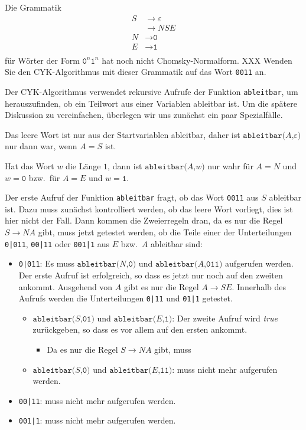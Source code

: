 Die Grammatik
\begin{align*}
S&\to \varepsilon \\
 &\to NSE \\
N&\to \texttt{0} \\
E&\to \texttt{1} \\
\end{align*}
für Wörter der Form
$\texttt{0}^n\texttt{1}^n$
hat noch nicht Chomsky-Normalform.
XXX
Wenden Sie den CYK-Algorithmus mit dieser Grammatik auf das Wort
\texttt{0011} an.

\def\ableitbar#1#2{
	\texttt{ableitbar(}#1\texttt{,}#2\texttt{)}
}

\begin{loesung}
Der CYK-Algorithmus verwendet rekursive Aufrufe der Funktion
\texttt{ableitbar}, um herauszufinden, ob ein Teilwort aus einer 
Variablen ableitbar ist.
Um die spätere Diskussion zu vereinfachen, überlegen wir uns zunächst
ein paar Spezialfälle.

Das leere Wort ist nur aus der Startvariablen ableitbar, daher ist
$\ableitbar{A}{\varepsilon}$ nur dann war, wenn $A=S$ ist.

Hat das Wort $w$ die Länge $1$, dann ist 
$\ableitbar{A}{w}$ nur wahr
für $A=N$ und $w=\texttt{0}$
bzw.~für $A=E$ und $w=\texttt{1}$.

Der erste Aufruf der Funktion \texttt{ableitbar} fragt, ob das Wort
\texttt{0011} aus $S$ ableitbar ist.
Dazu muss zunächst kontrolliert werden, ob das leere Wort vorliegt,
dies ist hier nicht der Fall.
Dann kommen die Zweierregeln dran, da es nur die Regel $S\to NA$
gibt, muss jetzt getestet werden, ob die Teile einer der Unterteilungen
\texttt{0|011},
\texttt{00|11} oder
\texttt{001|1}
aus $E$ bzw.~$A$ ableitbar sind:
\begin{itemize}
\item
\texttt{0|011}:
Es muss $\ableitbar{N}{\texttt{0}}$ und $\ableitbar{A}{\texttt{011}}$ 
aufgerufen werden.
Der erste Aufruf ist erfolgreich, so dass es jetzt nur noch auf den
zweiten ankommt.
Ausgehend von $A$ gibt es nur die Regel $A\to SE$.
Innerhalb des Aufrufs werden die Unterteilungen
\texttt{0|11} 
und
\texttt{01|1} 
getestet.
\begin{itemize}
\item
$\ableitbar{S}{\texttt{01}}$ und $\ableitbar{E}{\texttt{1}}$:
Der zweite Aufruf wird {\em true} zurückgeben, so dass es vor allem
auf den ersten ankommt.
\begin{itemize}
\item
Da es nur die Regel $S\to NA$ gibt, muss 
\end{itemize}
\item
$\ableitbar{S}{\texttt{0}}$ und $\ableitbar{E}{\texttt{11}}$:
muss nicht mehr aufgerufen werden.
\end{itemize}
\item
\texttt{00|11}: muss nicht mehr aufgerufen werden.
\item
\texttt{001|1}: muss nicht mehr aufgerufen werden.
\end{itemize}



\end{loesung}
